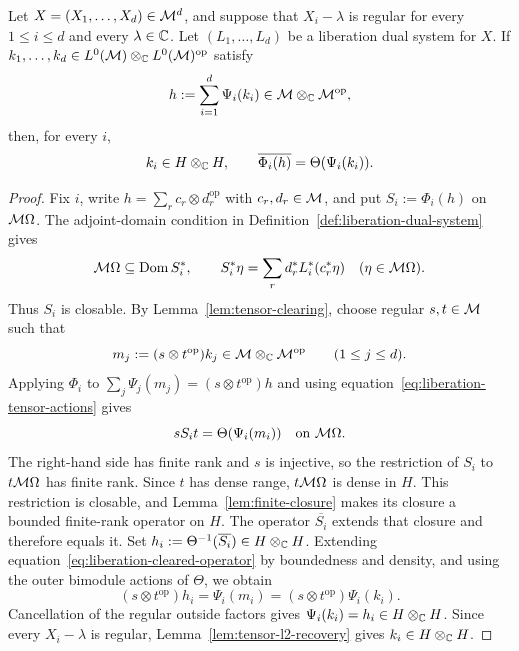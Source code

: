 \begin{lemma}\label{lem:tensor-images-l2}
Let $X=(X_1,\ldots,X_d)\in\mathcal M^d$, and suppose that $X_i-\lambda$ is regular for every $1\leq i\leq d$ and every $\lambda\in\mathbb C$.
Let $(L_1,\ldots,L_d)$ be a liberation dual system for $X$.
If $k_1,\ldots,k_d\in L^0(\mathcal M)\otimes_{\mathbb C}L^0(\mathcal M)^{\mathrm{op}}$ satisfy
\[
 h:=\sum_{i=1}^d\Psi_i(k_i)\in\mathcal M\otimes_{\mathbb C}\mathcal M^{\mathrm{op}},
\]
then, for every $i$,
\[
 k_i\in H\otimes_{\mathbb C}H,
 \qquad \overline{\Phi_i(h)}=\Theta(\Psi_i(k_i)).
\]
\end{lemma}
\begin{proof}
Fix $i$, write $h=\sum_r c_r\otimes d_r^{\mathrm{op}}$ with $c_r,d_r\in\mathcal M$, and put $S_i:=\Phi_i(h)$ on $\mathcal M\Omega$.
The adjoint-domain condition in Definition~\ref{def:liberation-dual-system} gives
\[
 \mathcal M\Omega\subseteq\operatorname{Dom} S_i^*,\qquad
 S_i^*\eta=\sum_r d_r^*L_i^*(c_r^*\eta)
 \quad(\eta\in\mathcal M\Omega).
\]
Thus $S_i$ is closable.
By Lemma~\ref{lem:tensor-clearing}, choose regular $s,t\in\mathcal M$ such that
\[
 m_j:=(s\otimes t^{\mathrm{op}})k_j
 \in\mathcal M\otimes_{\mathbb C}\mathcal M^{\mathrm{op}}
 \qquad(1\leq j\leq d).
\]
Applying $\Phi_i$ to $\sum_j\Psi_j(m_j)=(s\otimes t^{\mathrm{op}})h$ and using equation~\eqref{eq:liberation-tensor-actions} gives
\begin{equation}\label{eq:liberation-cleared-operator}
 sS_it=\Theta(\Psi_i(m_i))\quad\text{on }\mathcal M\Omega.
\end{equation}
The right-hand side has finite rank and $s$ is injective, so the restriction of $S_i$ to $t\mathcal M\Omega$ has finite rank.
Since $t$ has dense range, $t\mathcal M\Omega$ is dense in $H$.
This restriction is closable, and Lemma~\ref{lem:finite-closure} makes its closure a bounded finite-rank operator on $H$.
The operator $\overline{S_i}$ extends that closure and therefore equals it.
Set $h_i:=\Theta^{-1}(\overline{S_i})\in H\otimes_{\mathbb C}H$.
Extending equation~\eqref{eq:liberation-cleared-operator} by boundedness and density, and using the outer bimodule actions of $\Theta$, we obtain
\[
 (s\otimes t^{\mathrm{op}})h_i
 =\Psi_i(m_i)
 =(s\otimes t^{\mathrm{op}})\Psi_i(k_i).
\]
Cancellation of the regular outside factors gives $\Psi_i(k_i)=h_i\in H\otimes_{\mathbb C}H$.
Since every $X_i-\lambda$ is regular, Lemma~\ref{lem:tensor-l2-recovery} gives $k_i\in H\otimes_{\mathbb C}H$.
\end{proof}

